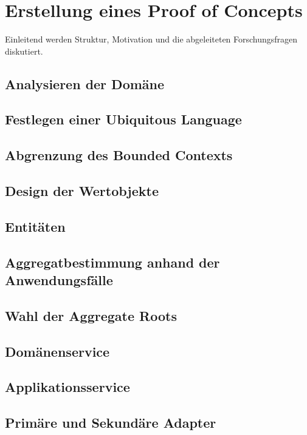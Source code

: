 

\chapter{Erstellung eines Proof of Concepts}

Einleitend werden Struktur, Motivation und die abgeleiteten Forschungsfragen diskutiert.

\section{Analysieren der Domäne}
\blindtext

\section{Festlegen einer Ubiquitous Language}
\blindtext

\section{Abgrenzung des Bounded Contexts}
\blindtext

\section{Design der Wertobjekte}
\blindtext

\section{Entitäten}
\blindtext

\section{Aggregatbestimmung anhand der Anwendungsfälle}
\blindtext

\section{Wahl der Aggregate Roots}
\blindtext

\section{Domänenservice}
\blindtext

\section{Applikationsservice}
\blindtext

\section{Primäre und Sekundäre Adapter}
\blindtext